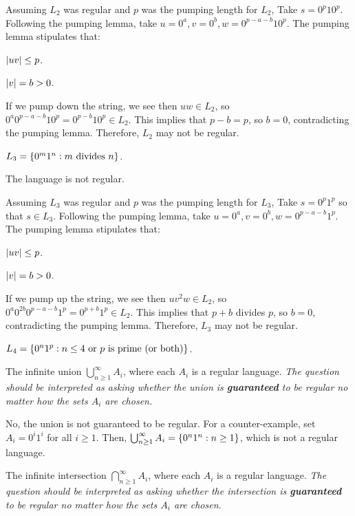 \begin{problem}
\begin{enumalph}
\begin{Answer}
        \step
        Assuming $L_2$ was regular and $p$ was the pumping length for $L_2$,
        Take $s = 0^p10^p$.
        Following the pumping lemma, take $u = 0^a, v = 0^b, w = 0^{p-a-b}10^p$.
        The pumping lemma stipulates that:
        \begin{enumroman}
          \item $\lvert uv\rvert \le p$.
          \item $\lvert v\rvert = b > 0$.
        \end{enumroman}
        If we pump down the string, we see then $uw \in L_2$,
        so $0^a0^{p-a-b}10^p = 0^{p-b}10^p \in L_2$.
        This implies that $p - b = p$, so $b = 0$,
        contradicting the pumping lemma.
        Therefore, $L_2$ may not be regular.
      \end{Answer}
    \item $L_3 = \left\{0^m 1^n : m \text{ divides } n\right\}$.
      \begin{Answer}
        The language is not regular.

        \step
        Assuming $L_3$ was regular and $p$ was the pumping length for $L_3$,
        Take $s = 0^p1^p$ so that $s \in L_3$.
        Following the pumping lemma, take $u = 0^a, v = 0^b, w = 0^{p-a-b}1^p$.
        The pumping lemma stipulates that:
        \begin{enumroman}
          \item $\lvert uv\rvert \le p$.
          \item $\lvert v\rvert = b > 0$.
        \end{enumroman}
        If we pump up the string, we see then $uv^2w \in L_2$,
        so $0^a0^{2b}0^{p-a-b}1^p = 0^{p+b}1^p \in L_2$.
        This implies that $p + b$ divides $p$, so $b = 0$,
        contradicting the pumping lemma.
        Therefore, $L_3$ may not be regular.
      \end{Answer}
    \item $L_4 = \left\{0^n 1^p : n \le 4 \text{ or $p$ is prime (or both)}\right\}$.
    \item The infinite union $\bigcup_{n \geq 1}^\infty A_i$, where each $A_i$
      is a regular language.
      \emph{
        The question should be interpreted as asking
        whether the union is \textbf{guaranteed} to be regular
        no matter how the sets $A_i$ are chosen.
      }
      \begin{Answer}
        No, the union is not guaranteed to be regular.
        For a counter-example, set $A_i = 0^i1^i$ for all $i \geq 1$.
        Then, $\bigcup_{n \geq 1}^\infty A_i = \left\{0^n1^n : n \ge 1\right\}$,
        which is not a regular language.
      \end{Answer}
    \item The infinite intersection $\bigcap_{n \geq 1}^\infty A_i$, where each $A_i$
      is a regular language.
      \emph{
        The question should be interpreted as asking
        whether the intersection is \textbf{guaranteed} to be regular
        no matter how the sets $A_i$ are chosen.
      }
      \begin{Answer}
        

\end{Answer}
\end{enumalph}
\end{problem}

